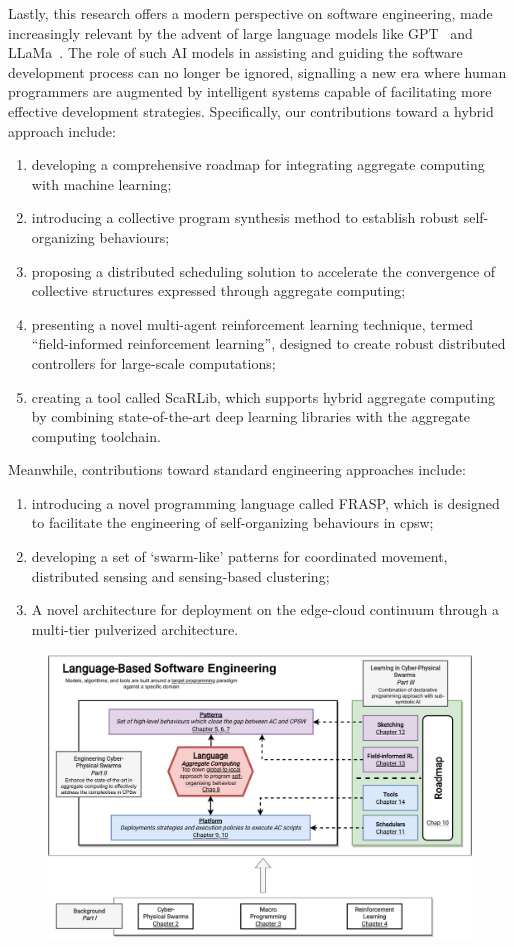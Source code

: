 \begin{refsection}
% 
Lastly, this research offers a modern perspective on software engineering, 
 made increasingly relevant by the advent of large language models like GPT~\cite{floridi2020gpt} and LLaMa~\cite{touvron2023llama}. 
 The role of such AI models in assisting and guiding the software development process can no longer be ignored, 
 signalling a new era where human programmers are augmented by intelligent systems capable of facilitating more effective development strategies.
Specifically, our contributions toward a hybrid approach include:
\begin{enumerate}
    \item developing a comprehensive roadmap for integrating aggregate computing with machine learning;
    \item introducing a collective program synthesis method to establish robust self-organizing behaviours;
    \item proposing a distributed scheduling solution to accelerate the convergence of collective structures expressed through aggregate computing;
    \sloppy
    \item presenting a novel multi-agent reinforcement learning technique, termed ``field-informed reinforcement learning'', designed to create robust distributed controllers for large-scale computations;
    \item creating a tool called ScaRLib, which supports hybrid aggregate computing by combining state-of-the-art deep learning libraries with the aggregate computing toolchain.
\end{enumerate}
Meanwhile, contributions toward standard engineering approaches include:
\begin{enumerate}
    \item introducing a novel programming language called FRASP, 
    which is designed to facilitate the engineering of self-organizing behaviours in \ac{cpsw};
    \item developing a set of `swarm-like' patterns for coordinated movement, distributed sensing and sensing-based clustering;
    \item A novel architecture for deployment on the edge-cloud continuum through a multi-tier pulverized architecture.
\end{enumerate}
\begin{figure}
    \includegraphics[width=\textwidth]{chapters/img/contribution-visual-2.drawio.pdf}

\end{figure}
\end{refsection}

